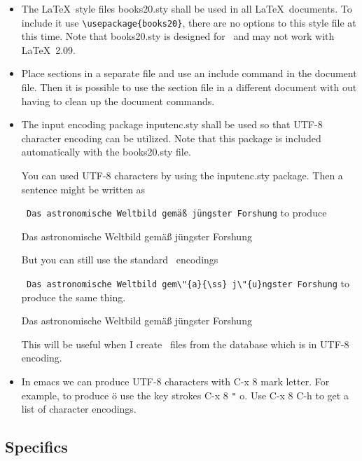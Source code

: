 \documentclass{article}
\begin{document}
\begin{itemize}
  
\item The \LaTeX\ style files books20.sty shall be used in all
  \LaTeX\ documents. To include it use \verb|\usepackage{books20}|, there
  are no options to this style file at this time. Note that books20.sty
  is designed for \LaTeXe\ and may not work with \LaTeX\ 2.09.
  

\item Place sections in a separate file and use an include command in the
  document file. Then it is possible to use the section file in a
  different document with out having to clean up the document commands.

\item {The input encoding package inputenc.sty shall be used so that
  UTF-8 character encoding can be utilized. Note that this package is
  included automatically with the books20.sty file.

  You can used UTF-8 characters by using the inputenc.sty
  package.  Then a sentence might be written as
  
  \verb| Das astronomische Weltbild gemäß jüngster Forshung|
  to produce

  Das astronomische Weltbild gemäß jüngster Forshung

  But you can still use the standard \LaTeXe\ encodings
  
  \verb| Das astronomische Weltbild gem\"{a}{\ss} j\"{u}ngster Forshung|
  to produce the same thing.

  Das astronomische Weltbild gem\"{a}{\ss} j\"{u}ngster Forshung

  This will be useful when I create \LaTeXe\ files from the database
  which is in UTF-8 encoding.
}

\item In emacs we can produce UTF-8 characters with C-x 8 mark letter.
  For example, to produce ö use the key strokes C-x 8 \verb|"| o. Use C-x 8 C-h
  to get a list of character encodings.
  
\end{itemize}

\subsection{Specifics}
\end{document}
